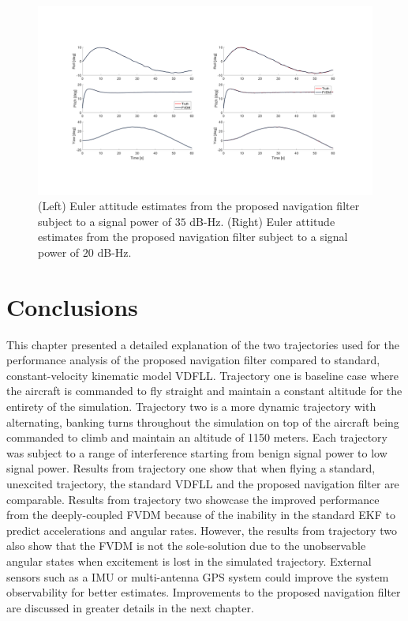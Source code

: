 \begin{figure}[!ht]
    \centering
    \includegraphics[width=\linewidth]{Figures/resultsv2/Slide10.PNG}
    \caption{(Left) Euler attitude estimates from the proposed navigation filter subject to a signal power of \(35\) dB-Hz. (Right) Euler attitude estimates from the proposed navigation filter subject to a signal power of \(20\) dB-Hz.}\label{fig:fixthis3}
\end{figure}

\clearpage

\section{\textbf{Conclusions}}

This chapter presented a detailed explanation of the two trajectories used for the performance analysis of the proposed navigation filter compared to standard, constant-velocity kinematic model VDFLL\@. Trajectory one is baseline case where the aircraft is commanded to fly straight and maintain a constant altitude for the entirety of the simulation. Trajectory two is a more dynamic trajectory with alternating, banking turns throughout the simulation on top of the aircraft being commanded to climb and maintain an altitude of 1150 meters. Each trajectory was subject to a range of interference starting from benign signal power to low signal power. Results from trajectory one show that when flying a standard, unexcited trajectory, the standard VDFLL and the proposed navigation filter are comparable. Results from trajectory two showcase the improved performance from the deeply-coupled FVDM because of the inability in the standard EKF to predict accelerations and angular rates. However, the results from trajectory two also show that the FVDM is not the sole-solution due to the unobservable angular states when excitement is lost in the simulated trajectory. External sensors such as a IMU or multi-antenna GPS system could improve the system observability for better estimates. Improvements to the proposed navigation filter are discussed in greater details in the next chapter.
